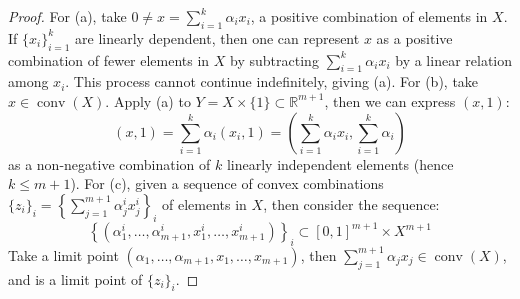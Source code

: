 \begin{proof}
	For (a), take $0\neq x=\sum_{i=1}^k\alpha_ix_i$, a positive combination of elements in $X$. If $\{x_i\}_{i=1}^k$ are linearly dependent, then one can represent $x$ as a positive combination of fewer elements in $X$ by subtracting $\sum_{i=1}^k \alpha_ix_i$ by a linear relation among $x_i$. This process cannot continue indefinitely, giving (a). For (b), take $x\in \operatorname{conv}(X)$. Apply (a) to $Y=X\times\{1\}\subset \mathbb{R}^{m+1}$, then we can express $(x,1)$:
	\[
		(x,1) = \sum_{i=1}^k \alpha_i (x_i,1)= \left(\sum_{i=1}^k \alpha_i x_i, \sum_{i=1}^k\alpha_i \right)
	\]
	as a non-negative combination of $k$ linearly independent elements (hence $k\leq m + 1$). For (c), given a sequence of convex combinations $\{z_i\}_i=\left\{\sum_{j=1}^{m+1}\alpha_j^ix_j^i\right\}_i$ of elements in $X$, then consider the sequence:
	\[\left\{(\alpha_1^i,\dotsc,\alpha_{m+1}^i,x_1^i,\dotsc,x_{m+1}^i)\right\}_i\subset [0,1]^{m+1}\times X^{m+1}\]
	Take a limit point $(\alpha_1,\dotsc,\alpha_{m+1},x_1,\dotsc,x_{m+1})$, then $\sum_{j=1}^{m+1} \alpha_jx_j\in \operatorname{conv}(X)$, and is a limit point of $\{z_i\}_i$.
\end{proof}


